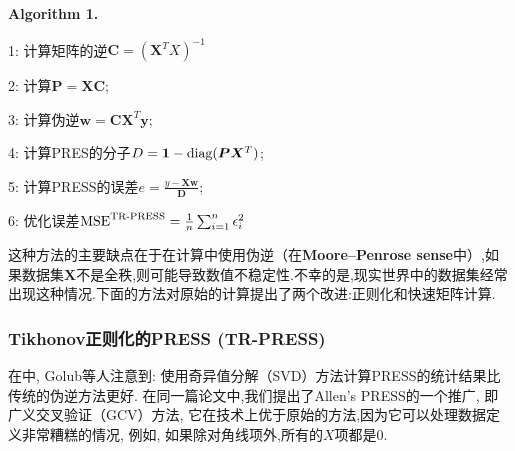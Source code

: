 \textbf{Algorithm 1.}

1: 计算矩阵的逆$\bm C= (\bm X^T X)^{-1}$

2: 计算$\bm P = \bm X\bm C$;

3: 计算伪逆$\bm w = \bm C\bm X^T\bm y$;

4: 计算PRES的分子$D = \bm 1-\textup{diag}(\bm P\bm X^T)$;

5: 计算PRESS的误差$e = \frac{y-\bm X \bm w} {\bm D} $;

6: 优化误差$\textup{MSE}^{\textup{TR-PRESS}}=\frac 1 n \sum_{i=1}^n \epsilon_i^2$

这种方法的主要缺点在于在计算中使用伪逆（在\textbf{Moore–Penrose sense}中）,如果数据集$\bm X$不是全秩,则可能导致数值不稳定性.不幸的是,现实世界中的数据集经常出现这种情况.下面的方法对原始的计算提出了两个改进:正则化和快速矩阵计算.
\subsubsection{Tikhonov正则化的PRESS (TR-PRESS)}
在\cite{golub1979 generalized}中, Golub等人注意到: 使用奇异值分解（SVD）方法计算PRESS的统计结果比传统的伪逆方法更好.
在同一篇论文中,我们提出了Allen's PRESS的一个推广, 即广义交叉验证（GCV）方法, 它在技术上优于原始的方法,因为它可以处理数据定义非常糟糕的情况, 例如, 如果除对角线项外,所有的$X$项都是0.

